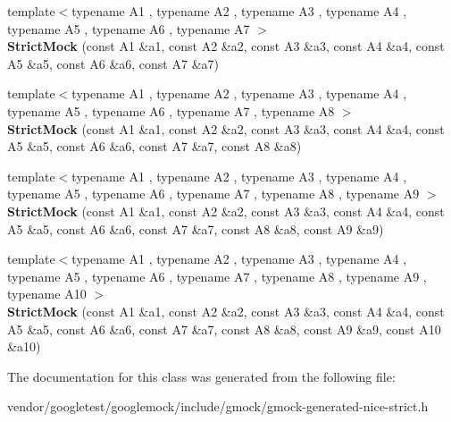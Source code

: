\begin{DoxyCompactItemize}
\item 
{\footnotesize template$<$typename A1 , typename A2 , typename A3 , typename A4 , typename A5 , typename A6 , typename A7 $>$ }\\{\bfseries Strict\+Mock} (const A1 \&a1, const A2 \&a2, const A3 \&a3, const A4 \&a4, const A5 \&a5, const A6 \&a6, const A7 \&a7)\hypertarget{classtesting_1_1StrictMock_a4af48752fc22815250369292b9c064bc}{}\label{classtesting_1_1StrictMock_a4af48752fc22815250369292b9c064bc}

\item 
{\footnotesize template$<$typename A1 , typename A2 , typename A3 , typename A4 , typename A5 , typename A6 , typename A7 , typename A8 $>$ }\\{\bfseries Strict\+Mock} (const A1 \&a1, const A2 \&a2, const A3 \&a3, const A4 \&a4, const A5 \&a5, const A6 \&a6, const A7 \&a7, const A8 \&a8)\hypertarget{classtesting_1_1StrictMock_aac6eaaad3e94491ada7bb43ee6149775}{}\label{classtesting_1_1StrictMock_aac6eaaad3e94491ada7bb43ee6149775}

\item 
{\footnotesize template$<$typename A1 , typename A2 , typename A3 , typename A4 , typename A5 , typename A6 , typename A7 , typename A8 , typename A9 $>$ }\\{\bfseries Strict\+Mock} (const A1 \&a1, const A2 \&a2, const A3 \&a3, const A4 \&a4, const A5 \&a5, const A6 \&a6, const A7 \&a7, const A8 \&a8, const A9 \&a9)\hypertarget{classtesting_1_1StrictMock_a4129f247ae087d586fdb04f450422d3e}{}\label{classtesting_1_1StrictMock_a4129f247ae087d586fdb04f450422d3e}

\item 
{\footnotesize template$<$typename A1 , typename A2 , typename A3 , typename A4 , typename A5 , typename A6 , typename A7 , typename A8 , typename A9 , typename A10 $>$ }\\{\bfseries Strict\+Mock} (const A1 \&a1, const A2 \&a2, const A3 \&a3, const A4 \&a4, const A5 \&a5, const A6 \&a6, const A7 \&a7, const A8 \&a8, const A9 \&a9, const A10 \&a10)\hypertarget{classtesting_1_1StrictMock_a4936b0a5622b39e974deae12ecb1430b}{}\label{classtesting_1_1StrictMock_a4936b0a5622b39e974deae12ecb1430b}

\end{DoxyCompactItemize}


The documentation for this class was generated from the following file\+:\begin{DoxyCompactItemize}
\item 
vendor/googletest/googlemock/include/gmock/gmock-\/generated-\/nice-\/strict.\+h\end{DoxyCompactItemize}
